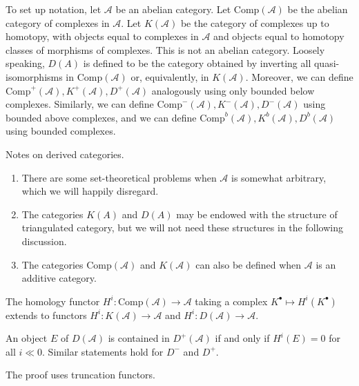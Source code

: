 \noindent
To set up notation, let $\mathcal{A}$ be an abelian category. Let
$\text{Comp}(\mathcal{A})$ be the abelian category of complexes in
$\mathcal{A}$. Let $K(\mathcal{A})$ be the category of complexes up to
homotopy, with objects equal to complexes in $\mathcal{A}$ and objects equal to
homotopy classes of morphisms of complexes. This is not an abelian category.
Loosely speaking, $D(A)$ is defined to be the category obtained by inverting
all quasi-isomorphisms in $\text{Comp}(\mathcal{A})$ or, equivalently, in
$K(\mathcal{A})$. Moreover, we can define $\text{Comp}^+(\mathcal{A}),
K^+(\mathcal{A}), D^+(\mathcal{A})$ analogously using only bounded below
complexes. Similarly, we can define $\text{Comp}^-(\mathcal{A}),
K^-(\mathcal{A}), D^-(\mathcal{A})$ using bounded above complexes, and we can
define $\text{Comp}^b(\mathcal{A}), K^b(\mathcal{A}), D^b(\mathcal{A})$ using
bounded complexes.

\begin{remark}
\label{remarks-derived-categories}
Notes on derived categories.
\begin{enumerate}
\item
There are some set-theoretical problems when $\mathcal{A}$ is somewhat
arbitrary, which we will happily disregard.
\item
The categories $K(A)$ and $D(A)$ may be endowed with the structure of
triangulated category, but we will not need these structures in the following
discussion.
\item
The categories $\text{Comp}(\mathcal{A})$ and $K(\mathcal{A})$ can also be
defined when $\mathcal{A}$ is an additive category.
\end{enumerate}
\end{remark}

\noindent
The homology functor $H^i: \text{Comp}(\mathcal{A}) \to \mathcal{A}$ taking a
complex $K^\bullet \mapsto H^i(K^\bullet)$ extends to functors $H^i:
K(\mathcal{A}) \to \mathcal{A}$ and $H^i: D(\mathcal{A}) \to \mathcal{A}$.

\begin{lemma}
\label{lemma-when-in-bounded}
An object $E$ of $D(\mathcal{A})$ is contained in $D^+(\mathcal{A})$ if and
only if $H^i(E) =0 $ for all $i \ll 0$. Similar statements hold for $D^-$ and
$D^+$.
\end{lemma}

\noindent
The proof uses truncation functors.

